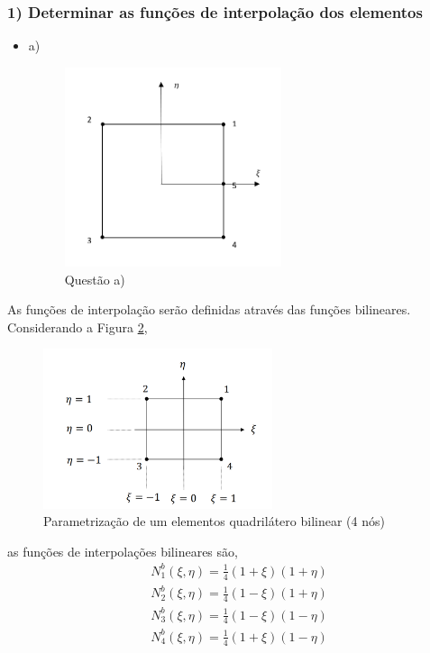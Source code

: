 \subsubsection{1) Determinar as funções de interpolação dos elementos}
%
\begin{itemize}
	\item a)
	\begin{figure}[H]
	\includegraphics[width=0.6\textwidth,center]{fig/cap6_1_a.PNG}
	\caption{Questão a)} 
	\label{cap6:cap6_1_a}
	\end{figure}
%
\end{itemize}
%
As funções de interpolação serão definidas através das funções bilineares. Considerando a Figura \ref{cap6:quad_bilinear_0}, 
%
\begin{figure}[H]
	\includegraphics[width=0.6\textwidth,center]{fig/quadrilatero_4_livro.PNG}
	\caption{Parametrização de um elementos quadrilátero bilinear (4 nós)} 
	\label{cap6:quad_bilinear_0}
\end{figure}
%
as funções de interpolações bilineares são,
%
\begin{equation}
	\begin{split}
		&N^b_1(\xi, \eta) = \frac{1}{4}(1 + \xi)(1 + \eta)\\
		&N^b_2(\xi, \eta) = \frac{1}{4}(1 - \xi)(1 + \eta)\\
		&N^b_3(\xi, \eta) = \frac{1}{4}(1 - \xi)(1 - \eta)\\
		&N^b_4(\xi, \eta) = \frac{1}{4}(1 + \xi)(1 - \eta)
	\end{split}
\end{equation}
